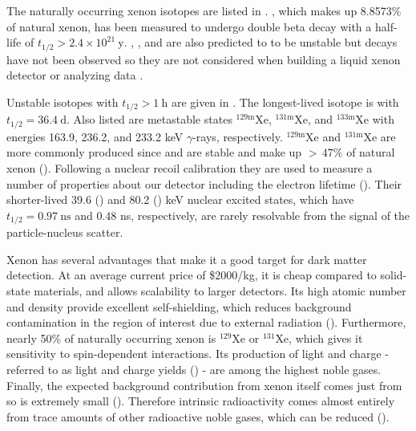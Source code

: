 The naturally occurring xenon isotopes are listed in .  , which makes up 8.8573\% of natural xenon,
has been measured to undergo double beta decay with a half-life of $t_{1/2} > 2.4 \times 10^{21}\ \mathrm{y}$.  ,
,
and  are also predicted to to be unstable but decays have not been observed so they are not considered when building a
liquid xenon detector or analyzing data .

Unstable isotopes with $t_{1/2} > 1\ \mathrm{h}$ are given in .  The longest-lived isotope is
 with $t_{1/2} = 36.4\ \mathrm{d}$.  Also listed are metastable states $\mathrm{^{129m}Xe}$, $\mathrm{^{131m}Xe}$, and
$\mathrm{^{133m}Xe}$ with energies 163.9, 236.2, and 233.2 keV $\gamma$-rays, respectively.  $\mathrm{^{129m}Xe}$ and $\mathrm{^{131m}Xe}$
are more commonly produced since  and  are stable and make up ${>}\, 47\%$ of natural xenon
().  Following a nuclear recoil calibration they are used to measure a number of properties about our detector
including the electron lifetime ().  Their shorter-lived 39.6
() and 80.2 () keV nuclear
excited states, which have $t_{1/2} = 0.97\ \mathrm{ns}$ and 0.48 ns, respectively, are rarely resolvable from the signal of the
particle-nucleus scatter.

Xenon has several advantages that make it a good target for dark matter detection.  At an average current price of \$2000/kg, it is cheap
compared to solid-state materials, and allows
scalability to larger detectors.  Its high atomic number and density provide excellent self-shielding, which reduces background contamination
in the region of interest due to external radiation
().  Furthermore, nearly 50\% of naturally occurring xenon is $^{129}$Xe or $^{131}$Xe,
which gives it sensitivity to spin-dependent interactions.  Its production of light and charge - referred to as light and charge yields
() - are among the highest noble gases.  Finally, the expected background contribution
from xenon itself comes just from  so is extremely small ().  Therefore
intrinsic radioactivity comes almost entirely from trace amounts of other radioactive noble gases, which can be reduced
().


